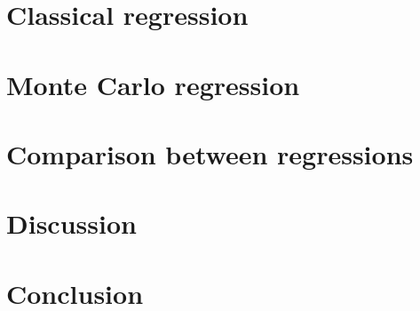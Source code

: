 \documentclass{article}
\begin{document}
	\section{Classical regression}
	\newpage
	\section{Monte Carlo regression}
	\newpage
	\section{Comparison between regressions}
	\newpage
	\section{Discussion}
	\newpage
	\section{Conclusion}
	\newpage
 	\Litterature
  
\end{document}
